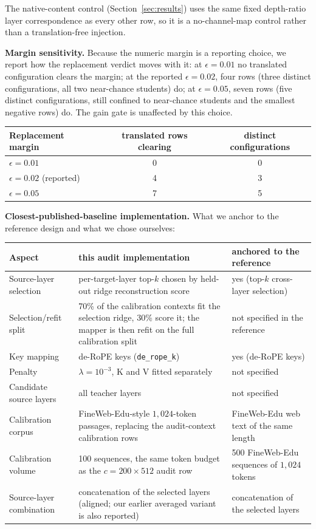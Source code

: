\documentclass{article} %
\begin{document}
The native-content control (Section~\ref{sec:results}) uses the same fixed
depth-ratio layer correspondence as every other row, so it is a
no-channel-map control rather than a translation-free injection.

\textbf{Margin sensitivity.} Because the numeric margin is a reporting choice, we report how the
replacement verdict moves with it: at $\epsilon{=}0.01$ no translated configuration clears the margin; at
the reported $\epsilon{=}0.02$, four rows (three distinct configurations, all two near-chance students) do;
at $\epsilon{=}0.05$, seven rows (five distinct configurations, still confined to near-chance students and the
smallest negative rows) do. The gain gate is unaffected by this choice.

\begin{center}\scriptsize
\begin{tabular}{lcc}
\toprule
Replacement margin & translated rows clearing & distinct configurations \\
\midrule
$\epsilon=0.01$ & 0 & 0 \\
$\epsilon=0.02$ (reported) & 4 & 3 \\
$\epsilon=0.05$ & 7 & 5 \\
\bottomrule
\end{tabular}\end{center}

\textbf{Closest-published-baseline implementation.} What we anchor to the reference design and what we chose
ourselves:

\begin{center}\footnotesize
\begin{tabular}{p{3.0cm}p{5.5cm}p{3.6cm}}
\toprule
Aspect & this audit implementation & anchored to the reference \\
\midrule
Source-layer selection & per-target-layer top-$k$ chosen by held-out ridge reconstruction score
 & yes (top-$k$ cross-layer selection) \\
Selection/refit split & 70\% of the calibration contexts fit the selection ridge, 30\% score it; the mapper is
then refit on the full calibration split & not specified in the reference \\
Key mapping & de-RoPE keys (\texttt{de\_rope\_k}) & yes (de-RoPE keys) \\
Penalty & $\lambda=10^{-3}$, K and V fitted separately & not specified \\
Candidate source layers & all teacher layers & not specified \\
Calibration corpus & FineWeb-Edu-style $1{,}024$-token passages, replacing the
audit-context calibration rows & FineWeb-Edu web text of the same length \\
Calibration volume & 100 sequences, the same token budget as the $c{=}200\times512$ audit row & 500 FineWeb-Edu sequences of $1{,}024$ tokens \\
Source-layer combination & concatenation of the selected layers (aligned; our
earlier averaged variant is also reported) & concatenation of the selected layers \\
\bottomrule
\end{tabular}\end{center}
\end{document}
